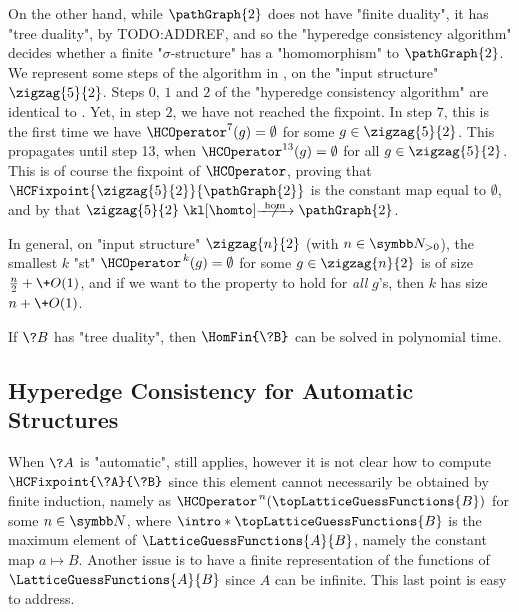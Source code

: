 \begin{example}
	On the other hand, while $\pathGraph{2}$ does not have "finite duality", it has
	"tree duality", by TODO:ADDREF, and so the "hyperedge consistency algorithm"
	decides whether a finite "$\sigma$-structure" has a "homomorphism" to $\pathGraph{2}$.
	We represent some steps of the algorithm in ,
	on the "input structure" $\zigzag{5}{2}$.
	Steps $0$, $1$ and $2$ of the "hyperedge consistency algorithm"
	are identical to .
	Yet, in step $2$, we have not reached the fixpoint.
	In step $7$, this is the first time
	we have $\HCOperator^{7}(g) = \emptyset$ for some
	$g\in \zigzag{5}{2}$. This propagates until step 13, 
	when $\HCOperator^{13}(g) = \emptyset$
	for all $g\in \zigzag{5}{2}$. This is of course the fixpoint of $\HCOperator$,
	proving that $\HCFixpoint{\zigzag{5}{2}}{\pathGraph{2}}$ is the constant map
	equal to $\emptyset$, and by 
	that $\zigzag{5}{2} \nothomto \pathGraph{2}$.

	In general, on "input structure" $\zigzag{n}{2}$ (with $n\in\Np$),
	the smallest $k$ "st" $\HCOperator^{\,k}(g) = \emptyset$
	for some $g \in \zigzag{n}{2}$ is of size $\frac{n}{2} + \+O(1)$,
	and if we want to the property to hold for \emph{all} $g$'s,
	then $k$ has size $n + \+O(1)$.
\end{example}

\begin{corollary}
	If $\?B$ has "tree duality", then $\HomFin{\?B}$ can be solved in
	polynomial time.
\end{corollary}


\subsection{Hyperedge Consistency for Automatic Structures}

When $\?A$ is "automatic",  still applies,
however it is not clear how to compute $\HCFixpoint{\?A}{\?B}$ since this element cannot
necessarily be obtained by finite induction, namely as
$\HCOperator^{\,n}(\topLatticeGuessFunctions{B})$ for some $n\in\N$, where
\AP$\intro*\topLatticeGuessFunctions{B}$ is the maximum element
of $\LatticeGuessFunctions{A}{B}$, namely the constant map $a \mapsto B$.
Another issue is to have a finite representation of the functions of
$\LatticeGuessFunctions{A}{B}$ since $A$ can be infinite. This last point is easy to address.

